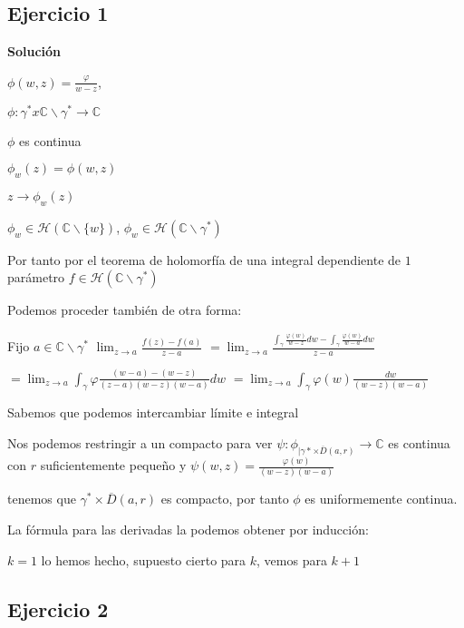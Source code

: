 \subsection{Ejercicio 1}

\textbf{Solución}

$\phi (w,z) = \frac{\varphi}{w-z}$, 

$\phi : \gamma^{\ast}x\mathbb{C}\backslash \gamma^{\ast} \rightarrow \mathbb{C}$

$\phi$ es continua

$\phi_w(z) = \phi(w,z)$

$z\rightarrow \phi_w(z)$

$\phi_w \in \mathcal{H}(\mathbb{C}\backslash \{w\})$, $\phi_w \in \mathcal{H}(\mathbb{C} \backslash \gamma^{\ast}  )$

Por tanto  por el teorema de holomorfía de una integral dependiente de $1$ parámetro $f\in\mathcal{H}(\mathbb{C}\backslash \gamma^{\ast})$

Podemos proceder también de otra forma:


Fijo $a\in\mathbb{C}\backslash \gamma^{\ast}$
$\lim_{z\rightarrow a} \frac{f(z)-f(a)}{z-a}$
$= \lim_{z\rightarrow a}  \frac{ \int_{\gamma} \frac{\varphi (w)}{w-z}dw  -  \int_{\gamma} \frac{\varphi (w)}{w-a}dw }{z-a}$

$= \lim_{z\rightarrow a} \int_{\gamma} \varphi \frac{(w-a)-(w-z)}{(z-a)(w-z)(w-a)} dw$
$= \lim_{z\rightarrow a} \int_{\gamma} \varphi (w)\frac{dw}{(w-z)(w-a)}$

Sabemos que podemos intercambiar límite e integral

Nos podemos restringir a un compacto para ver $\psi : \phi_{| \gamma{\ast}  \times  \overline{D}(a,r)} \rightarrow \mathbb{C}$  es continua con $r$ suficientemente pequeño y $\psi (w,z) = \frac{\varphi (w)}{(w-z)(w-a)}$

tenemos que $\gamma^{\ast} \times \overline{D}(a,r)$ es compacto, por tanto $\phi$ es uniformemente continua.

La fórmula para las derivadas la podemos obtener por inducción:

$k=1$ lo hemos hecho, supuesto cierto para $k$, vemos para $k+1$









\subsection{Ejercicio 2}

